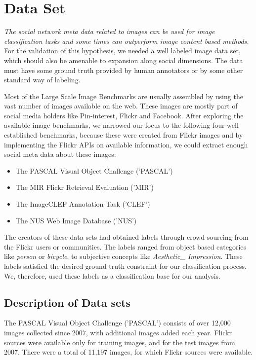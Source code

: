 
\chapter{Data Set} %

\label{Chapter3} %
\emph{The social network meta data related to images can be used for
image classification tasks and some times can outperform image 
content based methods.} For the validation of this 
hypothesis, we needed a well labeled image data set, which should also 
be amenable to expansion along social dimensions. 
The data must have some ground truth provided by human annotators or 
by some other standard way of labeling.

Most of the Large Scale Image Benchmarks are usually assembled by 
using the vast number of images available on the web. These images 
are  mostly part of social media holders like Pin-interest, 
Flickr and Facebook. After exploring the available image benchmarks, 
we narrowed our focus to the following four well established 
benchmarks, because these were created from Flickr images and by 
implementing the Flickr APIs on available information, we could 
extract enough social meta data about these images:
\begin{itemize}
\item The PASCAL Visual Object Challenge ('PASCAL') \cite{PASCAL}
\item The MIR Flickr Retrieval Evaluation ('MIR') \cite{MIR}
\item The ImageCLEF Annotation Task ('CLEF') \cite{CLEF}
\item The NUS Web Image Database ('NUS') \cite{NUS} 
\end{itemize}
The creators of these data sets had obtained labels through 
crowd-sourcing from the Flickr users  or communities. The labels 
ranged from object based categories like \textit{person} or \textit{bicycle}, to 
subjective concepts like \textit{Aesthetic\_ Impression}. These 
labels satisfied the desired ground truth constraint for our 
classification process. We, therefore, used these labels as a 
classification base for our analysis.

\section{Description of Data sets}
The PASCAL Visual Object Challenge ('PASCAL') consists of over 
12,000 images collected since 2007, with additional images added 
each year. Flickr sources were available only for 
training images, and for the test images from 2007. There were a total 
of 11,197 images, for which Flickr sources were available.

